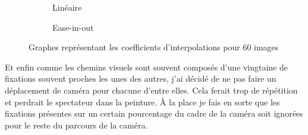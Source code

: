 \begin{figure}[ht]
    \centering
    \begin{subfigure}{.49\textwidth}
        \centering
        \caption{Linéaire}
        \label{subfig:lineaire}
    \end{subfigure}
    \begin{subfigure}{.49\textwidth}
        \centering
        \caption{Ease-in-out}
        \label{subfig:ease}
    \end{subfigure}
    \caption{Graphes représentant les coefficients d'interpolations pour 60 images}
    \label{fig:graphes}
\end{figure}

\par
Et enfin comme les chemins visuels sont souvent composés d'une vingtaine de fixations souvent proches les unes des autres, j'ai décidé de ne pas faire un déplacement de caméra pour chacune d'entre elles. Cela ferait trop de répétition et perdrait le spectateur dans la peinture. À la place je fais en sorte que les fixations présentes sur un certain pourcentage du cadre de la caméra soit ignorées pour le reste du parcours de la caméra.

